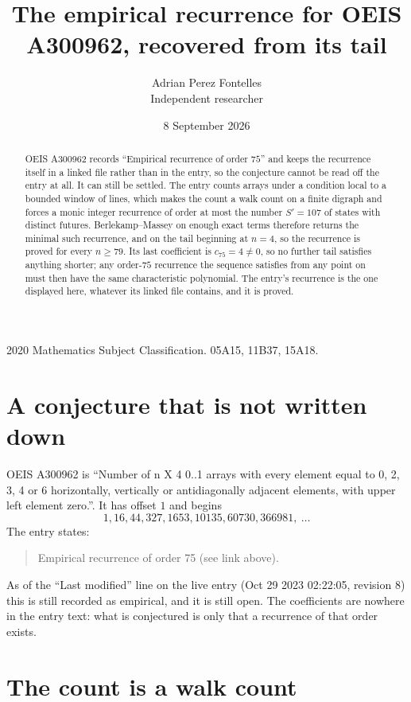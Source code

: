 \documentclass[11pt,a4paper]{article}
\title{The empirical recurrence for OEIS A300962, recovered from its tail}
\author{Adrian Perez Fontelles\\ \small Independent researcher}
\date{8 September 2026}
\theoremstyle{plain}
\theoremstyle{definition}
\begin{document}
\maketitle

\begin{abstract}
OEIS A300962 records ``Empirical recurrence of order $75$'' and keeps the recurrence itself in
a linked file rather than in the entry, so the conjecture cannot be read off the entry at all.
It can still be settled. The entry counts arrays under a condition local to a bounded window of
lines, which makes the count a walk count on a finite digraph and forces a monic integer
recurrence of order at most the number $S'=107$ of states with distinct futures. Berlekamp--Massey on
enough exact terms therefore returns the minimal such recurrence, and on the tail beginning at $n=4$, so the recurrence is proved for every $n\ge79$.
Its last coefficient is $c_{75}=4\neq0$, so no further tail satisfies anything
shorter; any order-$75$ recurrence the sequence satisfies from any point on must then have
the same characteristic polynomial. The entry's recurrence is the one displayed here, whatever
its linked file contains, and it is proved.
\end{abstract}

\noindent\small 2020 Mathematics Subject Classification. 05A15, 11B37, 15A18.\normalsize

\section{A conjecture that is not written down}

OEIS A300962 is ``Number of n X 4 0..1 arrays with every element equal to 0, 2, 3, 4 or 6 horizontally, vertically or antidiagonally adjacent elements, with upper left element zero.''. It has offset $1$ and begins
\[
1, 16, 44, 327, 1653, 10135, 60730, 366981,\ \dots
\]
The entry states:
\begin{quote}
Empirical recurrence of order 75 (see link above).
\end{quote}
As of the ``Last modified'' line on the live entry (Oct 29 2023 02:22:05, revision 8)
this is still recorded as empirical, and it is still open. The coefficients are nowhere in the
entry text: what is conjectured is only that a recurrence of that order exists.

\section{The count is a walk count}
\end{document}
